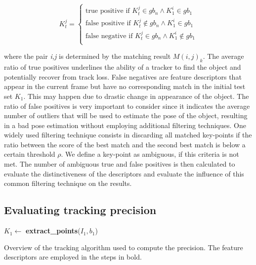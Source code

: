\begin{equation}
K_{t}^{j} = 
\begin{cases}
\text{true positive}  \text{ if } K_{t}^{j} \in gb_{n} \land K_{1}^{i} \in gb_{1} \\
\text{false positive}  \text{ if } K_{t}^{j} \notin gb_{n} \land K_{1}^{i} \in gb_{1} \\
\text{false negative}  \text{ if } K_{t}^{j} \in gb_{n} \land K_{1}^{i} \notin gb_{1} \\
\end{cases}
\end{equation}

where the pair \textit{i,j} is determined by the matching result $M(i,j)_{k}$. The average ratio of true positives underlines the ability of a tracker to find the object and potentially recover from track loss. False negatives are feature descriptors that appear in the current frame but have no corresponding match in the initial test set $K_{1}$. This may happen due to drastic change in appearance of the object. The ratio of false positives is very important to consider since it indicates the average number of outliers that will be used to estimate the pose of the object, resulting in a bad pose estimation without employing additional filtering techniques. One widely used filtering technique consists in discarding all matched key-points if the ratio between the score of the best match and the second best match is below a certain threshold $\rho$. We define a key-point as ambiguous, if this criteria is not met. The  number of ambiguous true and false positives is then calculated to evaluate the distinctiveness of the descriptors and evaluate the influence of this common filtering technique on the results.

\subsection{Evaluating tracking precision}

\begin{algorithm}[h]
 $K_{1} \gets$ \textbf{extract\_points}($I_{1},b_1$)\;
 \caption{\label{alg:algorithm}Overview of the tracking algorithm used to compute the precision. The feature descriptors are employed in the steps in bold. }
\end{algorithm}

